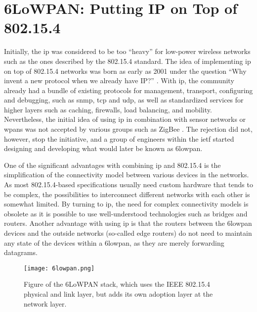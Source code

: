 \section{6LoWPAN: Putting IP on Top of 802.15.4}
\label{sec:6lowpan}


Initially, the \gls{ip} was considered to be too ``heavy'' for low-power wireless networks such as the ones described by the 802.15.4 standard. The idea of implementing \gls{ip} on top of 802.15.4 networks was born as early as 2001 under the question ``Why invent a new protocol when we already have IP?'' \cite{Mulligan2007}. With \gls{ip}, the community already had a bundle of existing protocols for management, transport, configuring and debugging, such as \gls{snmp}, \gls{tcp} and \gls{udp}, as well as standardized services for higher layers such as caching, firewalls, load balancing, and mobility. Nevertheless, the initial idea of using \gls{ip} in combination with sensor networks or \gls{wpan}s was not accepted by various groups such as ZigBee \cite{Mulligan2007}. The rejection did not, however, stop the initiative, and a group of engineers within the \gls{ietf} started designing and developing what would later be known as \gls{6lowpan}.

One of the significant advantages with combining \gls{ip} and 802.15.4 is the simplification of the connectivity model between various devices in the networks. As most 802.15.4-based specifications usually need custom hardware that tends to be complex, the possibilities to interconnect different networks with each other is somewhat limited. By turning to \gls{ip}, the need for complex connectivity models is obsolete as it is possible to use well-understood technologies such as bridges and routers. Another advantage with using \gls{ip} is that the routers between the \gls{6lowpan} devices and the outside networks (so-called edge routers) do not need to maintain any state of the devices within a \gls{6lowpan}, as they are merely forwarding datagrams.

\begin{figure}[h]
	\centering
	\texttt{[image: 6lowpan.png]}
	\caption[Figure of the 6LoWPAN stack, which uses the IEEE 802.15.4 physical and link layer.]{Figure of the 6LoWPAN stack, which uses the IEEE 802.15.4 physical and link layer, but adds its own adoption layer at the network layer.}
	\label{fig:6lowpan-stack}
\end{figure}

